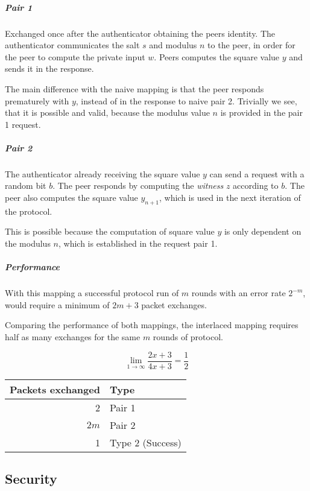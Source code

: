 \subparagraph{Pair 1} Exchanged once after the authenticator obtaining the peers identity. The authenticator communicates the salt $s$ and modulus $n$ to the peer, in order for the peer to compute the private input $w$. 
Peers computes the square value $y$ and sends it in the response.

The main difference with the naive mapping is that the peer responds prematurely with $y$, instead of in the response to naive pair 2. %
Trivially we see, that it is possible and valid, because the modulus value $n$ is provided in the pair 1 request.

\subparagraph{Pair 2}
The authenticator already receiving the square value $y$ can send a request with a random bit $b$. The peer responds by computing the \textit{witness} $z$ according to $b$.
The peer also computes the square value $y_{n+1}$, which is used in the next iteration of the protocol.

This is possible because the computation of square value $y$ is only dependent on the modulus $n$, which is established in the request pair 1.

\subparagraph{Performance}
With this mapping a successful protocol run of $m$ rounds with an error rate $2^{-m}$, would require a minimum of $2m + 3$ packet exchanges.

Comparing the performance of both mappings, the interlaced mapping requires half as many exchanges for the same $m$ rounds of protocol.

$$\lim_{1 \rightarrow \infty} \frac{2x + 3}{4x + 3} = \frac{1}{2}$$

\bigskip

\begin{tabular}{r|l}
	Packets exchanged & Type\\
	\hline
	2 & Pair 1\\
	$2m$ & Pair 2\\
	1 & Type 2 (Success)\\
\end{tabular}

\subsection{Security}


